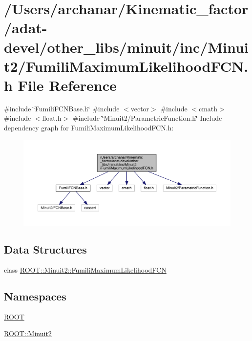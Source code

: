\hypertarget{adat-devel_2other__libs_2minuit_2inc_2Minuit2_2FumiliMaximumLikelihoodFCN_8h}{}\section{/\+Users/archanar/\+Kinematic\+\_\+factor/adat-\/devel/other\+\_\+libs/minuit/inc/\+Minuit2/\+Fumili\+Maximum\+Likelihood\+F\+CN.h File Reference}
\label{adat-devel_2other__libs_2minuit_2inc_2Minuit2_2FumiliMaximumLikelihoodFCN_8h}
{\ttfamily \#include \char`\"{}Fumili\+F\+C\+N\+Base.\+h\char`\"{}}\newline
{\ttfamily \#include $<$vector$>$}\newline
{\ttfamily \#include $<$cmath$>$}\newline
{\ttfamily \#include $<$float.\+h$>$}\newline
{\ttfamily \#include \char`\"{}Minuit2/\+Parametric\+Function.\+h\char`\"{}}\newline
Include dependency graph for Fumili\+Maximum\+Likelihood\+F\+C\+N.\+h\+:
\nopagebreak
\begin{figure}[H]
\begin{center}
\leavevmode
\includegraphics[width=350pt]{dc/d24/adat-devel_2other__libs_2minuit_2inc_2Minuit2_2FumiliMaximumLikelihoodFCN_8h__incl}
\end{center}
\end{figure}
\subsection*{Data Structures}
\begin{DoxyCompactItemize}
\item 
class \mbox{\hyperlink{classROOT_1_1Minuit2_1_1FumiliMaximumLikelihoodFCN}{R\+O\+O\+T\+::\+Minuit2\+::\+Fumili\+Maximum\+Likelihood\+F\+CN}}
\end{DoxyCompactItemize}
\subsection*{Namespaces}
\begin{DoxyCompactItemize}
\item 
 \mbox{\hyperlink{namespaceROOT}{R\+O\+OT}}
\item 
 \mbox{\hyperlink{namespaceROOT_1_1Minuit2}{R\+O\+O\+T\+::\+Minuit2}}
\end{DoxyCompactItemize}
